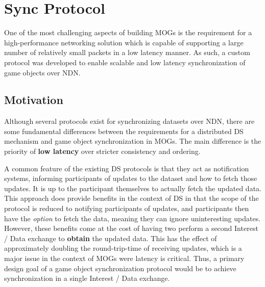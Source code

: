 \section{\game{} Sync Protocol}\label{sec:des:sync-protocol}
One of the most challenging aspects of building MOGs is the requirement for a high-performance networking solution which is capable of supporting a large number of relatively small packets in a low latency manner. As such, a custom protocol was developed to enable scalable and low latency synchronization of game objects over NDN.

\subsection{Motivation}
Although several protocols exist for synchronizing datasets over NDN, there are some fundamental differences between the requirements for a distributed DS mechanism and game object synchronization in MOGs. The main difference is the priority of \textbf{low latency} over stricter consistency and ordering.

A common feature of the existing DS protocols is that they act as notification systems, informing participants of updates to the dataset and how to fetch those updates. It is up to the participant themselves to actually fetch the updated data. This approach does provide benefits in the context of DS in that the scope of the protocol is reduced to notifying participants of updates, and participants then have the \textit{option} to fetch the data, meaning they can ignore uninteresting updates. However, these benefits come at the cost of having two perform a second Interest / Data exchange to \textbf{obtain} the updated data. This has the effect of approximately doubling the round-trip-time of receiving updates, which is a major issue in the context of MOGs were latency is critical. Thus, a primary design goal of a game object synchronization protocol would be to achieve synchronization in a single Interest / Data exchange.

